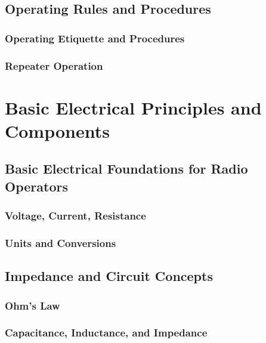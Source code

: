 \documentclass[12pt]{book}
\begin{document}
\chapter{Operating Rules and Procedures}
\section{Operating Etiquette and Procedures}

\section{Repeater Operation}

\part{Basic Electrical Principles and Components}
\chapter{Basic Electrical Foundations for Radio Operators}
\section{Voltage, Current, Resistance}

\section{Units and Conversions}

\chapter{Impedance and Circuit Concepts}
\section{Ohm's Law}

\section{Capacitance, Inductance, and Impedance}




\end{document}
